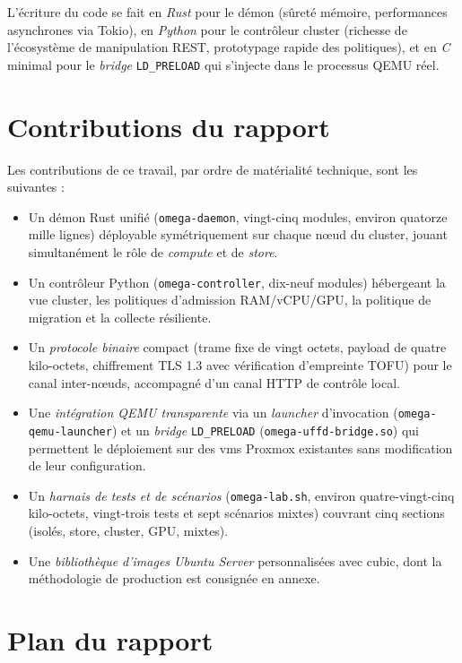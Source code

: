 L'écriture du code se fait en \emph{Rust} pour le démon (sûreté mémoire, performances asynchrones via Tokio), en \emph{Python} pour le contrôleur cluster (richesse de l'écosystème de manipulation REST, prototypage rapide des politiques), et en \emph{C} minimal pour le \emph{bridge} \texttt{LD\_PRELOAD} qui s'injecte dans le processus QEMU réel.

\section*{Contributions du rapport}

Les contributions de ce travail, par ordre de matérialité technique, sont les suivantes :

\begin{itemize}[leftmargin=*]
    \item Un démon Rust unifié (\texttt{omega-daemon}, vingt-cinq modules, environ quatorze mille lignes) déployable symétriquement sur chaque nœud du cluster, jouant simultanément le rôle de \emph{compute} et de \emph{store}.
    \item Un contrôleur Python (\texttt{omega-controller}, dix-neuf modules) hébergeant la vue cluster, les politiques d'admission RAM/vCPU/GPU, la politique de migration et la collecte résiliente.
    \item Un \emph{protocole binaire} compact (trame fixe de vingt octets, payload de quatre kilo-octets, chiffrement TLS 1.3 avec vérification d'empreinte TOFU) pour le canal inter-nœuds, accompagné d'un canal HTTP de contrôle local.
    \item Une \emph{intégration QEMU transparente} via un \emph{launcher} d'invocation (\texttt{omega-qemu-launcher}) et un \emph{bridge} \texttt{LD\_PRELOAD} (\texttt{omega-uffd-bridge.so}) qui permettent le déploiement sur des \acrshort{vm}s Proxmox existantes sans modification de leur configuration.
    \item Un \emph{harnais de tests et de scénarios} (\texttt{omega-lab.sh}, environ quatre-vingt-cinq kilo-octets, vingt-trois tests et sept scénarios mixtes) couvrant cinq sections (isolés, store, cluster, GPU, mixtes).
    \item Une \emph{bibliothèque d'images Ubuntu Server} personnalisées avec \acrshort{cubic}, dont la méthodologie de production est consignée en annexe.
\end{itemize}

\section*{Plan du rapport}

